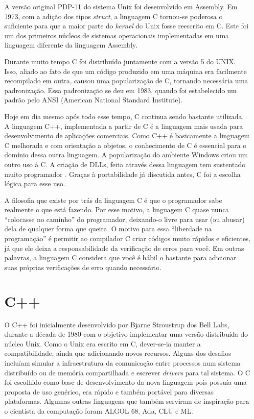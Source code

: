 \documentclass[
    12pt,               %
    openany,            %
    twoside,            %
    a4paper,            %
    brazil              %
    ]{abntex2}
\begin{document}
A versão original PDP-11 do sistema Unix foi desenvolvido em Assembly. Em 1973,
com a adição dos tipos \textit{struct}, a linguagem C tornou-se poderosa o
suficiente para que a maior parte do \textit{kernel} do Unix fosse reescrito em
C. Este foi um dos primeiros núcleos de sistemas operacionais implementadas em
uma linguagem diferente da linguagem Assembly. 

Durante muito tempo C foi distribuído juntamente com a versão 5 do UNIX. Isso,
aliado ao fato de que um código produzido em uma máquina era facilmente
recompilado em outra, causou uma popularização de C, tornando necessária uma
padronização. Essa padronização se deu em 1983, quando foi estabelecido um
padrão pelo ANSI (American National Standard Institute).

Hoje em dia mesmo após todo esse tempo, C continua sendo bastante utilizada. A
linguagem C++, implementada a partir de C é a linguagem mais usada para
desenvolvimento de aplicações comerciais.  Como C++ é basicamente a linguagem C
melhorada e com orientação a objetos, o conhecimento de C é essencial para o
domínio dessa outra linguagem. A popularização do ambiente Windows criou um
outro uso à C. A criação de DLLs, feita através dessa linguagem tem sustentado
muito programador . Graças à portabilidade já discutida antes, C foi a escolha
lógica para esse uso.

A filosofia que existe por trás da linguagem C é que o programador sabe
realmente o que está fazendo.  Por esse motivo, a linguagem C quase nunca
“colocasse no caminho” do programador, deixando-o livre para usar (ou abusar)
dela de qualquer forma que queira. O motivo para essa “liberdade na
programação” é permitir ao compilador C criar códigos muito rápidos e
eficientes, já que ele deixa a responsabilidade da verificação de erros para
você. Em outras palavras, a linguagem C considera que você é hábil o bastante
para adicionar suas próprias verificações de erro quando necessário. 

\chapter{C++}

O C++ foi inicialmente desenvolvido por Bjarne Stroustrup dos Bell Labs,
durante a década de 1980 com o objetivo implementar uma versão distribuída do
núcleo Unix. Como o Unix era escrito em C, dever-se-ia manter a
compatibilidade, ainda que adicionando novos recursos. Alguns dos desafios
incluíam simular a infraestrutura da comunicação entre processos num sistema
distribuído ou de memória compartilhada e escrever \textit{drivers} para tal
sistema. O C foi escolhido como base de desenvolvimento da nova linguagem pois
possuía uma proposta de uso genérico, era rápido e também portável para
diversas plataformas. Algumas outras linguagens que também serviram de
inspiração para o cientista da computação foram ALGOL 68, Ada, CLU e ML.
\end{document}
